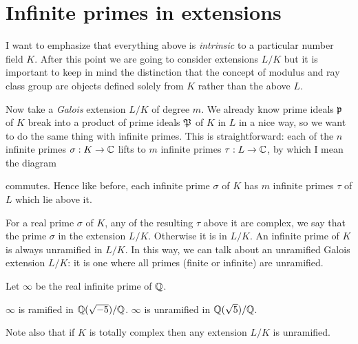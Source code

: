 \section{Infinite primes in extensions}
I want to emphasize that everything above is
\emph{intrinsic} to a particular number field $K$.
After this point we are going to consider extensions $L/K$
but it is important to keep in mind the distinction that
the concept of modulus and ray class group are objects
defined solely from $K$ rather than the above $L$.

Now take a \emph{Galois} extension $L/K$ of degree $m$.
We already know prime ideals $\mathfrak p$ of $K$ break into
a product of prime ideals $\mathfrak P$ of $K$ in $L$ in a nice way,
so we want to do the same thing with infinite primes.
This is straightforward: each of the $n$ infinite primes
$\sigma : K \to \mathbb C$ lifts to $m$ infinite primes $\tau : L \to \mathbb C$,
by which I mean the diagram
\begin{center}
\end{center}
commutes.
Hence like before, each infinite prime $\sigma$ of $K$
has $m$ infinite primes $\tau$ of $L$ which lie above it.

For a real prime $\sigma$ of $K$, any of the resulting $\tau$ above it
are complex, we say that the prime $\sigma$ 
in the extension $L/K$. Otherwise it is  in $L/K$.
An infinite prime of $K$ is always unramified in $L/K$.
In this way, we can talk about an unramified Galois extension $L/K$:
it is one where all primes (finite or infinite) are unramified.

\begin{example}
	Let $\infty$ be the real infinite prime of $\mathbb Q$.
	\begin{itemize}
		\ii $\infty$ is ramified in $\mathbb Q(\sqrt{-5})/\mathbb Q$.
		\ii $\infty$ is unramified in $\mathbb Q(\sqrt{5})/\mathbb Q$.
	\end{itemize}
	Note also that if $K$ is totally complex
	then any extension $L/K$ is unramified.
\end{example}

